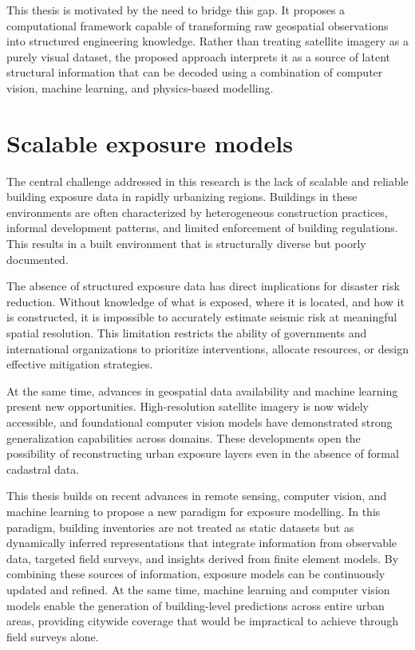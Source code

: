 This thesis is motivated by the need to bridge this gap. It proposes a computational framework capable of transforming raw geospatial observations into structured engineering knowledge. Rather than treating satellite imagery as a purely visual dataset, the proposed approach interprets it as a source of latent structural information that can be decoded using a combination of computer vision, machine learning, and physics-based modelling.

\renewcommand{\sectionnametext}{Scalable exposure models}
\renewcommand{\headingtextR}{\thesection. \sectionnametext}
\section{\sectionnametext}

The central challenge addressed in this research is the lack of scalable and reliable building exposure data in rapidly urbanizing regions. Buildings in these environments are often characterized by heterogeneous construction practices, informal development patterns, and limited enforcement of building regulations. This results in a built environment that is structurally diverse but poorly documented.

The absence of structured exposure data has direct implications for disaster risk reduction. Without knowledge of what is exposed, where it is located, and how it is constructed, it is impossible to accurately estimate seismic risk at meaningful spatial resolution. This limitation restricts the ability of governments and international organizations to prioritize interventions, allocate resources, or design effective mitigation strategies.

At the same time, advances in geospatial data availability and machine learning present new opportunities. High-resolution satellite imagery is now widely accessible, and foundational computer vision models have demonstrated strong generalization capabilities across domains. These developments open the possibility of reconstructing urban exposure layers even in the absence of formal cadastral data.

This thesis builds on recent advances in remote sensing, computer vision, and machine learning to propose a new paradigm for exposure modelling. In this paradigm, building inventories are not treated as static datasets but as dynamically inferred representations that integrate information from observable data, targeted field surveys, and insights derived from finite element models. By combining these sources of information, exposure models can be continuously updated and refined. At the same time, machine learning and computer vision models enable the generation of building-level predictions across entire urban areas, providing citywide coverage that would be impractical to achieve through field surveys alone.



